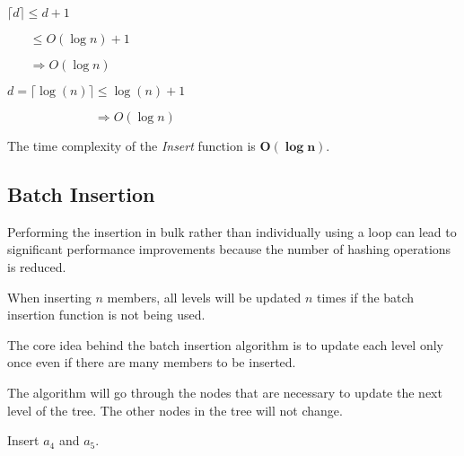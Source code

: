 \documentclass{article}
\begin{document}
$\lceil d \rceil \leq d + 1$



$\phantom{\lceil m \rceil} \leq O(\log n) + 1$



$\phantom{\lceil m \rceil} \Rightarrow \boxed{O(\log n)}$



$d = \lceil \log (n) \rceil \leq \log (n) + 1$



$\phantom{d = \lceil \log (n) \rceil} \Rightarrow O(\log n)$



The time complexity of the \textit{Insert} function is $\boldsymbol{O(\log n)}$.

\subsection{Batch Insertion}

Performing the insertion in bulk rather than individually using a loop can lead to significant performance improvements because the number of hashing operations is reduced.



When inserting $n$ members, all levels will be updated $n$ times if the batch insertion function is not being used.

The core idea behind the batch insertion algorithm is to update each level only once even if there are many members to be inserted.

The algorithm will go through the nodes that are necessary to update the next level of the tree. The other nodes in the tree will not change.



Insert $a_4$ and $a_5$.
\end{document}
